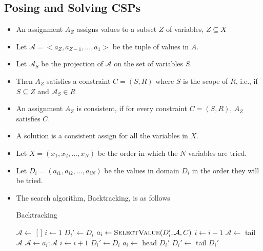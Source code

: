 \documentclass[a4paper]{article}
\begin{document}
\subsection{Posing and Solving CSPs}
\begin{itemize}
    \item An assignment $A_Z$ assigns values to a subset $Z$ of variables, $Z\subseteq X$
    \item Let $\mathcal{A}=<a_Z,a_{Z-1},...,a_1>$ be the tuple of values in $A$.
    \item Let $\mathcal{A}_S$ be the projection of $\mathcal{A}$ on the set of variables $S$.
    \item Then $A_Z$ satisfies a constraint $C=(S,R)$ where $S$ is the scope of $R$, i.e., if $S\subseteq Z$ and $\mathcal{A}_S\in R$
    \item An assignment $A_Z$ is consistent, if for every constraint $C=(S,R)$, $A_Z$ satisfies $C$.
    \item A solution is a consistent assign for all the variables in $X$.
    \item Let $X=(x_1,x_2,...,x_N)$ be the order in which the $N$ variables are tried.
    \item Let $D_i=(a_{i1},a_{i2},...,a_{iN})$ be the values in domain $D_i$ in the order they will be tried.
    \item The search algorithm, Backtracking, is as follows
    \begin{algorithm}[H]
        \caption{Backtracking}
        \begin{algorithmic}[1]
            \Statex {}
            \State $\mathcal{A}\gets$ [ ]
            \State $i\gets 1$
            \State $D_i'\gets D_i$
                \State $a_i\gets \Call{SelectValue}{D_i',\mathcal{A},C}$
                    \State $i\gets i-1$
                    \State $\mathcal{A}\gets$ tail $\mathcal{A}$
                \Else
                    \State $\mathcal{A}\gets a_i:\mathcal{A}$
                    \State $i\gets i+1$
                        \State $D_i'\gets D_i$
                    \EndIf
                \EndIf
            \EndWhile
            \State \Return {}
            \Statex
            \Statex {}
                \State $a_i\gets$ head $D_i'$
                \State $D_i'\gets$ tail $D_i'$

\end{algorithmic}
\end{algorithm}
\end{itemize}
\end{document}
